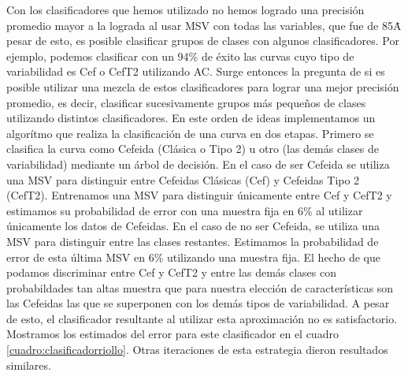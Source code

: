 \documentclass[letterpaper,12pt]{book}
\begin{document}
Con los clasificadores que hemos utilizado no hemos logrado una precisión promedio mayor a la lograda al usar MSV con todas las variables, que fue de 85\. A pesar de esto, es posible clasificar grupos de clases con algunos clasificadores. Por ejemplo, podemos clasificar con un 94\% de éxito las curvas cuyo tipo de variabilidad es Cef o CefT2 utilizando AC.  Surge entonces la pregunta de si es posible utilizar una mezcla de estos clasificadores para lograr una mejor precisión promedio, es decir, clasificar sucesivamente grupos más pequeños de clases utilizando distintos clasificadores. En este orden de ideas implementamos un algorítmo que realiza la clasificación de una curva en dos etapas. Primero se clasifica la curva como Cefeida (Clásica o Tipo 2) u otro (las demás clases de variabilidad) mediante un árbol de decisión. En el caso de ser Cefeida se utiliza una MSV para distinguir entre Cefeidas Clásicas (Cef) y Cefeidas Tipo 2 (CefT2). Entrenamos una MSV para distinguir únicamente entre Cef y CefT2 y estimamos su probabilidad de error con una muestra fija en 6\% al utilizar únicamente los datos de Cefeidas. En el caso de no ser Cefeida, se utiliza una MSV para distinguir entre las clases restantes. Estimamos la probabilidad de error de esta última MSV en 6\% utilizando una muestra fija. El hecho de que podamos discriminar entre Cef y CefT2 y entre las demás clases con probabildades tan altas muestra que para nuestra elección de características son las Cefeidas las que se superponen con los demás tipos de variabilidad.  A pesar de esto, el clasificador resultante al utilizar esta aproximación no es satisfactorio. Mostramos los estimados del error para este clasificador en el cuadro \ref{cuadro:clasificadorriollo}. Otras iteraciones de esta estrategia dieron resultados similares. 
\end{document}
